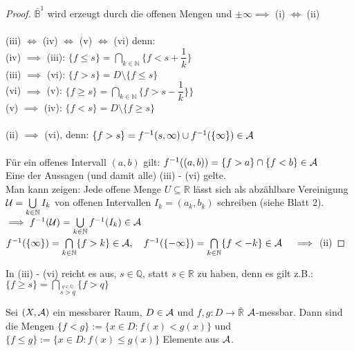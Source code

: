   \begin{proof}
    $\bar{\mathbb{B}}^1$ wird erzeugt durch die offenen Mengen und $\pm \infty \implies$ (i) $\Leftrightarrow$ (ii)\\
    \\
    (iii) $\Leftrightarrow$ (iv) $\Leftrightarrow$ (v) $\Leftrightarrow$ (vi) denn:\\
    (iv) $\implies$ (iii): $\{f \leq s \} = \bigcap\limits_{k \in \mathbb{N}} \{f < s + \dfrac{1}{k}\}$\\
    (iii) $\implies$ (vi): $\{f > s\} = D \setminus \{f \leq s\}$\\
    (vi) $\implies$ (v): $\{f \geq s \} = \bigcap\limits_{k \in \mathbb{N}} \{f > s - \dfrac{1}{k}\}\}$\\
    (v) $\implies$ (iv): $\{f < s\} = D \setminus \{f \geq s\}$\\
    \\
    (ii) $\implies$ (vi), denn: $\{f > s\} = f^{-1}(s,\infty) \cup f^{-1}(\{\infty\}) \in \mathcal{A}$\\
    \\
    Für ein offenes Intervall $(a,b)$ gilt: $f^{-1}((a,b)) = \{f > a\} \cap \{f < b\} \in \mathcal{A}$\\
    Eine der Aussagen (und damit alle) (iii) - (vi) gelte.\\
    Man kann zeigen: Jede offene Menge $U \subseteq \mathbb{R}$ lässt sich als abzählbare Vereinigung $\mathcal{U} = \bigcup\limits_{k \in \mathbb{N}} I_k$ von offenen Intervallen $I_k = (a_k, b_k)$ schreiben (siehe Blatt 2).\\
    $\implies f^{-1}(\mathcal{U}) = \bigcup\limits_{k \in \mathbb{N}} f^{-1}(I_k) \in \mathcal{A}$\\
    $f^{-1}(\{\infty\}) = \bigcap\limits_{k \in \mathbb{N}} \{f > k\} \in \script{A}, \ \ \ f^{-1}(\{-\infty\}) = \bigcap\limits_{k \in \mathbb{N}} \{f < -k\} \in \script{A} \ \ \ \implies$ (ii)
  \end{proof}

  \begin{remark}
    In (iii) - (vi) reicht es aus, $s \in \mathbb{Q}$, statt $s \in \mathbb{R}$ zu haben, denn es gilt z.B.:\\
    $\{f \geq s\} = \bigcap\limits_{\stackrel{q \in \mathbb{Q}}{s > q}} \{f > q\}$
  \end{remark}


  \begin{lemma}
    Sei $(X, \mathcal{A})$ ein messbarer Raum, $D \in \mathcal{A}$ und $f,g: D \to \bar{\mathbb{R}}$ $\mathcal{A}$-messbar. Dann sind die Mengen $\{f < g\} := \{x \in D: f(x) < g(x)\}$ und $\{f \leq g\} := \{x \in D: f(x) \leq g(x)\}$ Elemente aus $\mathcal{A}$.
  \end{lemma}

